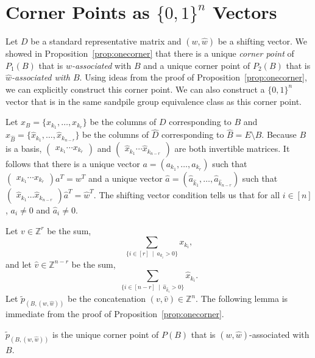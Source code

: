 \documentclass[ALCO,ThmDefs,Unicode,epreuves]{cedram}
\renewcommand{\tilde}{\widetilde}
\newcommand{\Z}{\mathbb{Z}}
\newcommand{\CB}{x_B}
\newcommand{\hCB}{x_{\widehat B}}
\newcommand{\colB}[1]{x_{k_{#1}}}
\newcommand{\hcolB}[1]{\widehat x_{k_{#1}}}
\begin{document}
\section{Corner Points as \texorpdfstring{$\{0,1\}^n$}{\{0,1\}n} Vectors}\label{sec:cornp}

Let $D$ be a standard representative matrix and $(w,\widehat w)$ be a shifting vector. We showed in Proposition~\ref{prop:onecorner} that there is a unique \emph{corner point} of $P_1(B)$ that is \emph{$w$-associated} with $B$ and a unique corner point of $P_2(B)$ that is \emph{$\widehat w$-associated with $B$}. Using ideas from the proof of Proposition~\ref{prop:onecorner}, we can explicitly construct this corner point. We can also construct a $\{0,1\}^n$ vector that is in the same sandpile group equivalence class as this corner point. 

Let $\CB = \{\colB 1,\dots, \colB r\}$ be the columns of $D$ corresponding to $B$ and $\hCB = \{\hcolB 1, \dots, \hcolB {n-r}\}$ be the columns of $\widehat D$ corresponding to $\widehat B = E \setminus B$. Because $B$ is a basis, $\begin{pmatrix} \colB 1 \cdots \colB r \end{pmatrix}$ and $\begin{pmatrix} \hcolB 1 \cdots \hcolB {n-r} \end{pmatrix}$ are both invertible matrices. It follows that there is a unique vector $a = (a_{k_1},\dots,a_{k_r})$ such that $\begin{pmatrix} \colB 1\cdots \colB r \end{pmatrix} a^T = w^T$ and a unique vector $\widehat a = (\widehat a_{\widehat k_1}, \dots, \widehat a_{\widehat k_{n-r}})$ such that $\begin{pmatrix} \hcolB 1\hdots \hcolB {n-r} \end{pmatrix} \widehat a^T = \widehat w^T$. The shifting vector condition tells us that for all $i\in [n]$, $a_i \not= 0$ and $\widehat a_i \not= 0$. 

Let $v\in\Z^r$ be the sum,
\[
\sum_{\{i \in [r]~\mid~a_{k_i} >0\}} \colB i,
\]
and let $\widehat v \in \Z^{n-r}$ be the sum,
\[
\sum_{\{i \in [n-r]~\mid~\hat a_{\hat k_i} >0\}} \hcolB i.
\]
Let $\tilde p_{(B,(w,\widehat{w}))}$ be the concatenation $(v,\widehat v) \in \Z^n$. The following lemma is immediate from the proof of Proposition~\ref{prop:onecorner}.

\begin{lemma}
$\tilde p_{(B,(w,\widehat w))}$ is the unique corner point of $P(B)$ that is $(w,\widehat w)$-associated with $B$. 
\end{lemma}
\end{document}
